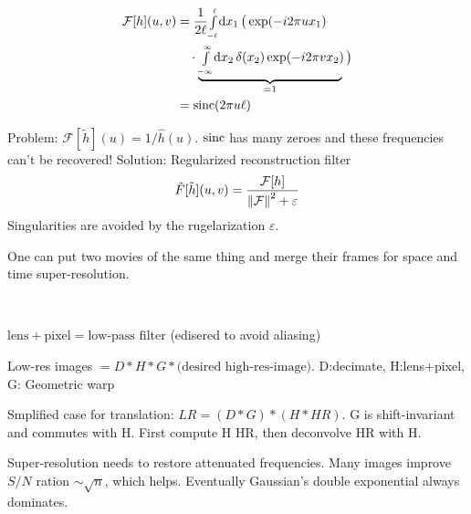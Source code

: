 \begin{compactdesc}
\begin{sideways}
\begin{minipage}[t]{1.3\columnwidth}
				\begin{align*}
					\mathcal{F}[h](u,v)&=\frac{1}{2\ell}{\scriptstyle\int\limits_{-\ell}^{\ell}}\mathrm d x_1\,\big( \exp\!\left( -i2\pi ux_1 \right)\\
					&\quad\cdot\underbrace{{\scriptstyle\int\limits_{-\infty}^{\infty}}\mathrm d x_2\, \delta(x_2)\exp\!\left( -i2\pi vx_2 \right)\!}_{=1}\,\big)\\
					&=\operatorname{sinc}\!\left(2\pi u\ell  \right)
				\end{align*}
			\end{minipage}
		\end{sideways}
		Problem: $\mathcal{F}[\tilde{h}](u)=1/\hat{h}(u)$. $\operatorname{sinc}$ has many zeroes and these frequencies can't be recovered! Solution: Regularized reconstruction filter
		\begin{gather*}
			\tilde{F}[\tilde{h}](u,v)=\frac{\mathcal{F}[h]}{\left\lVert \mathcal{F} \right\rVert^2+\varepsilon}
		\end{gather*}
		Singularities are avoided by the rugelarization $\varepsilon$.
	\item[\lp{Space-time super-resolution}] One can put two movies of the same thing and merge their frames for space and time super-resolution.
	\item[\lp{Spatial super-resolution}] \hfill\\
		\begin{enumerate*}[label=\protect\circled{\arabic*},itemjoin=]
			\item $\text{lens}+\text{pixel}=\text{low-pass filter}$ (edisered to avoid aliasing)\\
			\item Low-res images $=D*H*G*\text{(desired high-res-image)}$. D:decimate, H:lens+pixel, G: Geometric warp\\
			\item Smplified case for translation: $LR=(D*G)*(H*HR)$. G is shift-invariant and commutes with H. First compute H HR, then deconvolve HR with H.\\
			\item Super-resolution needs to restore attenuated frequencies. Many images improve $S/N$ ration $\sim\sqrt{n}$, which helps. Eventually Gaussian's double exponential always dominates.
		\end{enumerate*}
\end{compactdesc}
